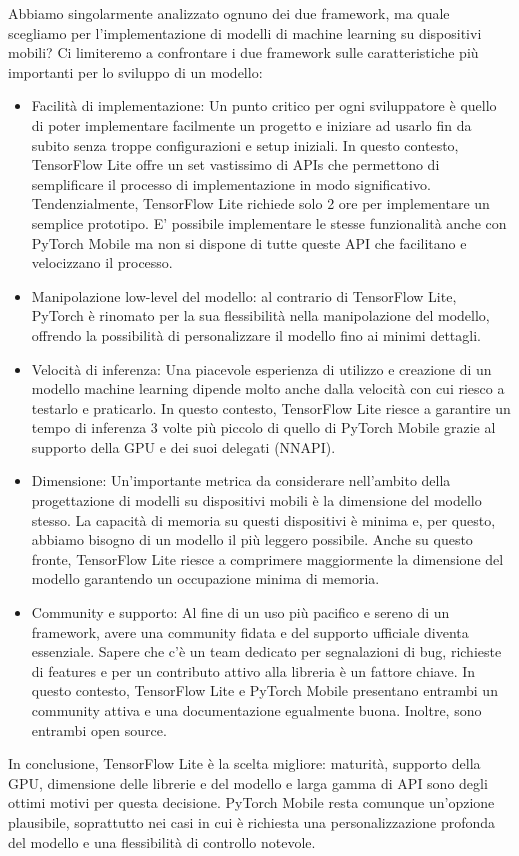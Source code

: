 Abbiamo singolarmente analizzato ognuno dei due framework, ma quale scegliamo per l’implementazione di modelli di machine learning su dispositivi mobili?
Ci limiteremo a confrontare i due framework sulle caratteristiche più importanti per lo sviluppo di un modello:
\begin{itemize}
    \item Facilità di implementazione: Un punto critico per ogni sviluppatore è quello di poter implementare facilmente un progetto e iniziare ad usarlo fin da subito senza troppe configurazioni e setup iniziali.
    In questo contesto, TensorFlow Lite offre un set vastissimo di APIs\cite{tensorvspyt} che permettono di semplificare il processo di implementazione in modo significativo. Tendenzialmente, TensorFlow Lite richiede solo 2 ore per
    implementare un semplice prototipo. E’ possibile implementare le stesse funzionalità anche con PyTorch Mobile ma non si dispone di tutte queste API che facilitano e velocizzano il processo.
    \item Manipolazione low-level del modello: al contrario di TensorFlow Lite, PyTorch è rinomato per la sua flessibilità nella manipolazione del modello\cite{pytorchvstensor}, offrendo la possibilità di personalizzare il modello fino ai minimi dettagli.
    \item Velocità di inferenza: Una piacevole esperienza di utilizzo e creazione di un modello machine learning dipende molto anche dalla velocità con cui riesco a testarlo e praticarlo. In questo contesto, TensorFlow Lite riesce a
    garantire un tempo di inferenza 3 volte più piccolo di quello di PyTorch Mobile grazie al supporto della GPU e dei suoi delegati (NNAPI).
    \item Dimensione: Un’importante metrica da considerare nell’ambito della progettazione di modelli su dispositivi mobili è la dimensione del modello stesso. La capacità di memoria su questi dispositivi è minima e, per questo, abbiamo
    bisogno di un modello il più leggero possibile. Anche su questo fronte, TensorFlow Lite riesce a comprimere maggiormente la dimensione del modello garantendo un occupazione minima di memoria.
    \item Community e supporto: Al fine di un uso più pacifico e sereno di un framework, avere una community fidata e del supporto ufficiale diventa essenziale. Sapere che c’è un team dedicato per segnalazioni di bug,
    richieste di features e per un contributo attivo alla libreria è un fattore chiave. In questo contesto, TensorFlow Lite e PyTorch Mobile presentano entrambi un community attiva e una documentazione egualmente buona.
    Inoltre, sono entrambi open source.
\end{itemize}

In conclusione, TensorFlow Lite è la scelta migliore: maturità, supporto della GPU, dimensione delle librerie e del modello e larga gamma di API sono degli ottimi motivi per questa decisione.
PyTorch Mobile resta comunque un’opzione plausibile, soprattutto nei casi in cui è richiesta una personalizzazione profonda del modello e una flessibilità di controllo notevole.